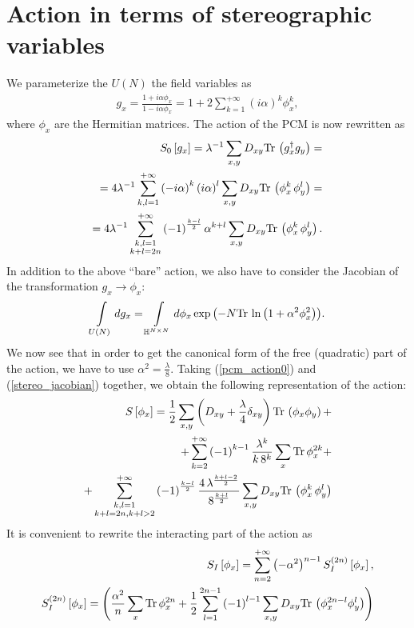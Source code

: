\documentclass[12pt]{article}
\newcommand{\lr}[1]{ \left( #1 \right) }
\newcommand{\lrs}[1]{ \left[ #1 \right] }
\newcommand{\tr}{ {\rm Tr} \, }
\newcommand{\expa}[1]{ \exp{\left( #1 \right)} }
\begin{document}
\section{Action in terms of stereographic variables}
\label{sec:action_stereo}

 We parameterize the $U\lr{N}$ the field variables as
\begin{eqnarray}
\label{stereographic_projection}
 g_x
 =
 \frac{1 + i \alpha \phi_x}{1 - i \alpha \phi_x}
 =
 1 + 2 \sum\limits_{k=1}^{+\infty} \lr{i \alpha}^k \phi_x^k
,
\end{eqnarray}
where $\phi_x$ are the Hermitian matrices. The action of the PCM is now rewritten as
\begin{eqnarray}
\label{pcm_action0}
 S_0\lrs{g_x} = \lambda^{-1} \sum\limits_{x,y} D_{x y} \tr\lr{g^{\dag}_x g_y}
 = \nonumber\\ =
 4 \lambda^{-1} \sum\limits_{k,l=1}^{+\infty} \lr{-i \alpha}^k \lr{i \alpha}^l
      \sum\limits_{x,y} D_{xy} \tr\lr{\phi_x^k \, \phi_y^l}
 = \nonumber\\ =
 4 \lambda^{-1} \sum\limits_{\substack{k,l=1\\k+l=2 n}}^{+\infty}
  \lr{-1}^{\frac{k-l}{2}} \alpha^{k+l}
       \sum\limits_{x,y} D_{xy} \tr\lr{\phi_x^k \, \phi_y^l} .
\end{eqnarray}
In addition to the above ``bare'' action, we also have to consider the Jacobian of the transformation $g_x \rightarrow \phi_x$:
\begin{eqnarray}
\label{stereo_jacobian}
 \int\limits_{U\lr{N}} dg_x = \int\limits_{\mathbb{H}^{N\times N}} d\phi_x \expa{-N \tr\ln\lr{1 + \alpha^2 \phi_x^2}} .
\end{eqnarray}
We now see that in order to get the canonical form of the free (quadratic) part of the action, we have to use $\alpha^2 = \frac{\lambda}{8}$. Taking (\ref{pcm_action0}) and (\ref{stereo_jacobian}) together, we obtain the following representation of the action:
\begin{eqnarray}
\label{pcm_action}
 S\lrs{\phi_x} =
 \frac{1}{2} \sum\limits_{x,y} \lr{D_{xy} + \frac{\lambda}{4} \delta_{x y}} \tr\lr{\phi_x \phi_y}
 + \nonumber \\ +
 \sum\limits_{k=2}^{+\infty} \lr{-1}^{k-1} \frac{\lambda^{k}}{k \, 8^k} \sum\limits_x \tr \phi_x^{2 k}
 + \nonumber \\ +
 \sum\limits_{\substack{k,l=1\\k+l=2 n,k+l>2}}^{+\infty}
  \lr{-1}^{\frac{k-l}{2}} \frac{4 \, \lambda^{\frac{k+l-2}{2}}}{8^{\frac{k+l}{2}}}
       \sum\limits_{x,y} D_{xy} \tr\lr{\phi_x^k \, \phi_y^l}
\end{eqnarray}
It is convenient to rewrite the interacting part of the action as
\begin{eqnarray}
\label{pcm_action_int}
 S_I\lrs{\phi_x}
 = \sum\limits_{n=2}^{+\infty} \lr{- \alpha^2}^{n-1} S_I^{\lr{2 n}}\lrs{\phi_x} ,
 \nonumber \\
 S_I^{\lr{2 n}}\lrs{\phi_x} =
 \lr{
  \frac{\alpha^2}{n} \sum\limits_x \tr \phi_x^{2 n}
  +
  \frac{1}{2} \sum\limits_{l=1}^{2 n - 1} \lr{-1}^{l-1}
  \sum\limits_{x,y} D_{x y} \tr\lr{\phi_x^{2 n - l} \phi_y^l }
 }
\end{eqnarray}
\end{document}
